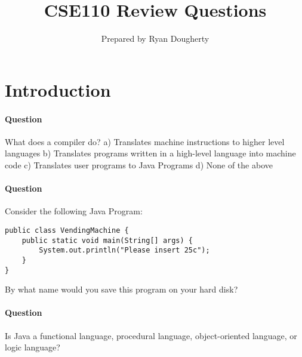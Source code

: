 \documentclass{article}
\title{CSE110 Review Questions}
\author{Prepared by Ryan Dougherty}
\date{}
\begin{document}
\maketitle

\section{Introduction}

\setcounter{question_num}{1}
\paragraph{Question }
What does a compiler do?
\newline a) Translates machine instructions to higher level languages
\newline b) Translates programs written in a high-level language into machine code
\newline c) Translates user programs to Java Programs
\newline d) None of the above

\addtocounter{question_num}{1}
\paragraph{Question }
Consider the following Java Program:
\begin{lstlisting}
public class VendingMachine {
	public static void main(String[] args) {
		System.out.println("Please insert 25c");
	}
}
\end{lstlisting}
By what name would you save this program on your hard disk?

\addtocounter{question_num}{1}
\paragraph{Question }
Is Java a functional language, procedural language, object-oriented language, or logic language?
\end{document}
